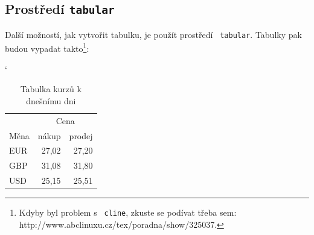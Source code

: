 \documentclass[11pt,a4paper]{article}
\begin{document}
\subsection{Prostředí \texttt{tabular} \label{sec2_2}}
Další možností, jak vytvořit tabulku, je použít prostředí \texttt{ tabular}. Tabulky pak budou vypadat takto\footnote{Kdyby byl problem s \texttt{ cline}, zkuste se podívat třeba sem: http://www.abclinuxu.cz/tex/poradna/show/325037.}:
\vspace{5mm}
\begin{table}[h]
\catcode`
\begin{center}
\begin{tabular}{|l|r|r|} \hline
& \multicolumn{2}{|c|}{Cena} \\ \cline{2-3}
Měna & nákup & prodej \\ \hline 
EUR & 27,02 & 27,20 \\
GBP & 31,08 & 31,80 \\
USD & 25,15 & 25,51 \\ \hline
\end{tabular}
\caption{Tabulka kurzů k dnešnímu dni}\label{tab:tab1}
\end{center}
\end{table}
\end{document}
